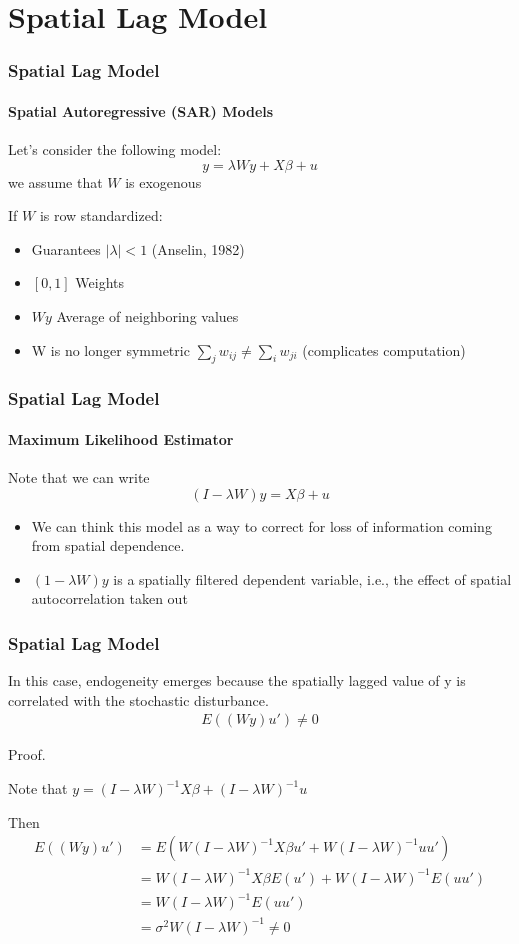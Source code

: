 \documentclass[
  shownotes,
  xcolor={svgnames},
  hyperref={colorlinks,citecolor=DarkBlue,linkcolor=DarkRed,urlcolor=DarkBlue}
  , aspectratio=169]{beamer}
\begin{document}
\section{Spatial Lag Model}
\begin{frame}[fragile]
\frametitle{Spatial Lag Model}
\framesubtitle{Spatial Autoregressive (SAR) Models}

Let's consider the following model:
\bigskip 
\[
y=\lambda Wy+X\beta+u
\]
\medskip
we assume that $W$ is exogenous

\medskip

If $W$ is row standardized:
\medskip
\begin{itemize}
\item Guarantees $|\lambda|<1$ (Anselin, 1982) 
\item $[0,1]$ Weights
\item $Wy$ Average of neighboring values
\item W is no longer symmetric $\sum_{j}w_{ij}\neq\sum_{i}w_{ji}$ (complicates
computation)
\end{itemize}

\end{frame}
\begin{frame}[fragile]
\frametitle{Spatial Lag Model}
\framesubtitle{Maximum Likelihood Estimator}

Note that we can write 
\bigskip 
\[
(I-\lambda W)y=X\beta+u
\]
\bigskip 
\begin{itemize}
\item We can think this model as a way to correct for loss of information coming from spatial dependence.
\bigskip 
\item $(1-\lambda W)y$ is a spatially filtered dependent variable, i.e.,
the effect of spatial autocorrelation taken out
\end{itemize}

\end{frame}
\begin{frame}[fragile]
\frametitle{Spatial Lag Model}

In this case, endogeneity emerges because the spatially lagged value
of y is correlated with the stochastic disturbance. 
\begin{align}
E((Wy)u')\neq 0
\end{align}

Proof.

Note that $y=(I-\lambda W)^{-1}X\beta+(I-\lambda W)^{-1}u$


Then
\begin{align}
E((Wy)u') & =E(W(I-\lambda W)^{-1}X\beta u'+W(I-\lambda W)^{-1}uu') \\
& =W(I-\lambda W)^{-1}X\beta E(u')+W(I-\lambda W)^{-1}E(uu') \\
& =W(I-\lambda W)^{-1}E(uu') \\
& =\sigma^{2}W(I-\lambda W)^{-1}\neq0 
\end{align}

\end{frame}
\end{document}
